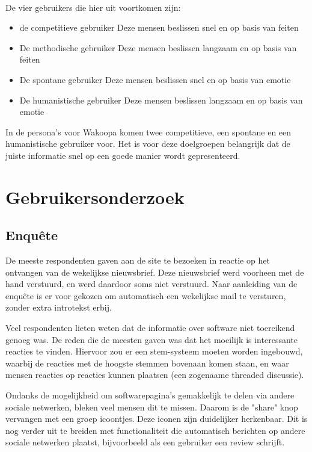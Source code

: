 \documentclass[a4paper, 10pt, pdftex]{report}
\begin{document}
      \paragraph{}De vier gebruikers die hier uit voortkomen zijn:

      \begin{itemize}
        \item de competitieve gebruiker
          Deze mensen beslissen snel en op basis van feiten
        \item De methodische gebruiker
          Deze mensen beslissen langzaam en op basis van feiten
        \item De spontane gebruiker
          Deze mensen beslissen snel en op basis van emotie
        \item De humanistische gebruiker
          Deze mensen beslissen langzaam en op basis van emotie
      \end{itemize}

      In de persona's voor Wakoopa komen twee competitieve, een spontane en een humanistische gebruiker voor. Het is voor deze doelgroepen belangrijk dat de juiste informatie snel op een goede manier wordt gepresenteerd.

    \section{Gebruikersonderzoek}
      \subsection{Enqu\^ete}
        De meeste respondenten gaven aan de site te bezoeken in reactie op het ontvangen van de wekelijkse nieuwsbrief. Deze nieuwsbrief werd voorheen met de hand verstuurd, en werd daardoor soms niet verstuurd. Naar aanleiding van de enqu\^ete is er voor gekozen om automatisch een wekelijkse mail te versturen, zonder extra introtekst erbij.

        Veel respondenten lieten weten dat de informatie over software niet toereikend genoeg was. De reden die de meesten gaven was dat het moeilijk is interessante reacties te vinden. Hiervoor zou er een stem-systeem moeten worden ingebouwd, waarbij de reacties met de hoogste stemmen bovenaan komen staan, en waar mensen reacties op reacties kunnen plaatsen (een zogenaame threaded discussie).

        Ondanks de mogelijkheid om softwarepagina's gemakkelijk te delen via andere sociale netwerken, bleken veel mensen dit te missen. Daarom is de "share" knop vervangen met een groep icoontjes. Deze iconen zijn duidelijker herkenbaar. Dit is nog verder uit te breiden met functionaliteit die automatisch berichten op andere sociale netwerken plaatst, bijvoorbeeld als een gebruiker een review schrijft.
\end{document}
